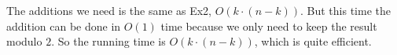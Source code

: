 The additions we need is the same as Ex2, $O(k\cdot (n-k))$.
But this time the addition can be done in $O(1)$ time because we only need to keep the result modulo $2$.
So the running time is $O(k\cdot (n-k))$, which is quite efficient.
